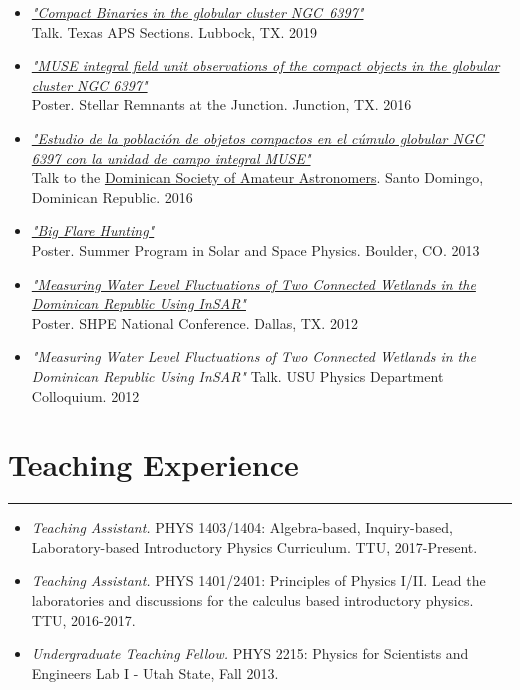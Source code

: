 \documentclass[letterpaper,10pt]{article}
\begin{document}
\begin{itemize}[label=$\blacktriangleright$]

	
\item \textit{\href{https://manuelpm.me/TexasAPS2019/}{"Compact Binaries in the globular cluster NGC~6397"}} \\Talk. Texas APS Sections. Lubbock, TX. 2019
	
\item \textit{\href{http://manuelpm.me/papers/MUSEposter.pdf}{"MUSE integral field unit observations of the compact objects in the globular cluster NGC 6397"}} \\Poster. Stellar Remnants at the Junction. Junction, TX. 2016




	\item \textit{\href{http://manuelpm.me/Astrodomtalk/}{"Estudio de la población de objetos compactos en el cúmulo globular NGC 6397 con la unidad de campo integral MUSE"}} \\Talk to the \href{http://astrodom.org/}{Dominican Society of Amateur Astronomers}. Santo Domingo, Dominican Republic. 2016


\item \textit{\href{http://manuelpm.me/papers/posterhao.pdf}{"Big Flare Hunting"}} \\Poster. Summer Program in Solar and Space Physics. Boulder, CO. 2013


\item \textit{\href{http://manuelpm.me/papers/posterinsar.pdf}{"Measuring Water Level Fluctuations of Two Connected Wetlands in the Dominican Republic Using InSAR"}} \\Poster. SHPE National Conference. Dallas, TX. 2012

\item \emph{"Measuring Water Level Fluctuations of Two Connected Wetlands in the Dominican Republic Using InSAR"}
Talk. USU Physics Department Colloquium. 2012
\end{itemize}

\section*{Teaching Experience}

\hrule
\vspace{.3 cm}


\begin{itemize}[label=$\blacktriangleright$]

	\item \emph{Teaching Assistant.} PHYS 1403/1404: Algebra-based, Inquiry-based, Laboratory-based Introductory Physics Curriculum. TTU, 2017-Present.  

	
\item \emph{Teaching Assistant.}  PHYS 1401/2401: Principles of Physics I/II. Lead the laboratories and discussions for the calculus based introductory physics. TTU, 2016-2017.  
  	  

  \item \emph{Undergraduate Teaching Fellow.}  PHYS 2215: Physics for Scientists and Engineers Lab I -  Utah State, Fall 2013.
  \end{itemize}
\end{document}
